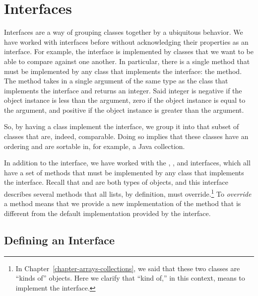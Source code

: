 \section{Interfaces}

Interfaces are a way of grouping classes together by a ubiquitous behavior. We have worked with interfaces before without acknowledging their properties as an interface. For example, the  interface is implemented by classes that we want to be able to compare against one another. In particular, there is a single method that must be implemented by any class that implements the  interface: the  method. The  method takes in a single argument of the same type as the class that implements the  interface and returns an integer. Said integer is negative if the object instance is less than the argument, zero if the object instance is equal to the argument, and positive if the object instance is greater than the argument.

So, by having a class implement the  interface, we group it into that subset of classes that are, indeed, comparable. Doing so implies that these classes have an ordering and are sortable in, for example, a Java collection. 

In addition to the  interface, we have worked with the , , and  interfaces, which all have a set of methods that must be implemented by any class that implements the interface. Recall that  and  are both types of  objects, and this interface describes several methods that all lists, by definition, must override.\footnote{In Chapter~\ref{chapter-arrays-collections}, we said that these two classes are ``kinds of''  objects. Here we clarify that ``kind of,'' in this context, means to implement the  interface.} To \emph{override} a method means that we provide a new implementation of the method that is different from the default implementation provided by the interface.

\subsection*{Defining an Interface}


